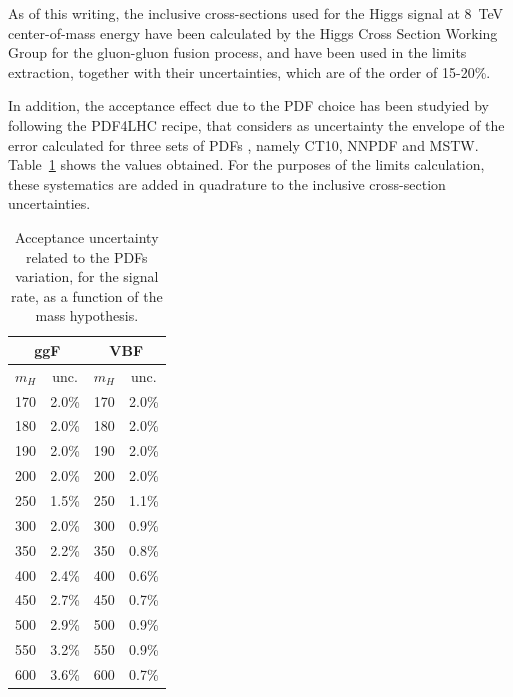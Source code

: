 As of this writing, the inclusive cross-sections used for the Higgs
signal at 8~TeV center-of-mass energy have been calculated by the
Higgs Cross Section Working Group
\cite{LHCHiggsCrossSectionWorkingGroup:2011ti} for the
gluon-gluon fusion process, and have been used in the limits
extraction, together with their uncertainties, which are of the
order of 15-20\%.


In addition, the acceptance effect due to the PDF choice has been
studyied by following the PDF4LHC recipe, that considers as
uncertainty the envelope of the error calculated for three sets of
PDFs \cite{Whalley:2005nh}, namely CT10, NNPDF and MSTW.
Table~\ref{tab:signalPDF} shows the values obtained.  For the purposes
of the limits calculation, these systematics are added in quadrature
to the inclusive cross-section uncertainties.
%
\begin{table}[h!t]
  \caption{Acceptance uncertainty related to the PDFs variation, 
           for the signal rate, as a function of the mass hypothesis.}
  \label{tab:signalPDF}
  \begin{center}
    \begin{tabular}{lc|lc}
      \hline
      \multicolumn{2}{c|}{ggF} & \multicolumn{2}{c}{VBF} \\
      \hline
      $m_{H}$ &  unc.   & $m_{H}$ &  unc.  \\
      \hline
       170  &  2.0\%  &  170  &  2.0\% \\ %
       180  &  2.0\%  &  180  &  2.0\% \\ %
       190  &  2.0\%  &  190  &  2.0\% \\ %
       200  &  2.0\%  &  200  &  2.0\% \\ %
       250  &  1.5\%  &  250  &  1.1\% \\  
       300  &  2.0\%  &  300  &  0.9\% \\  
       350  &  2.2\%  &  350  &  0.8\% \\  
       400  &  2.4\%  &  400  &  0.6\% \\  
       450  &  2.7\%  &  450  &  0.7\% \\  
       500  &  2.9\%  &  500  &  0.9\% \\  
       550  &  3.2\%  &  550  &  0.9\% \\  
       600  &  3.6\%  &  600  &  0.7\% \\  
      \hline
    \end{tabular}
  \end{center}
\end{table}


